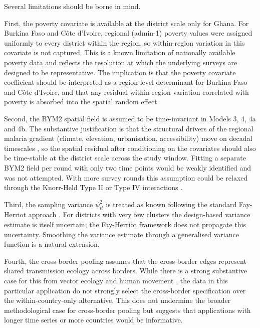 \documentclass{article}
\begin{document}
\label{sec:limitations}

Several limitations should be borne in mind.

First, the poverty covariate is available at the district scale only for
Ghana. For Burkina Faso and Côte d'Ivoire, regional (admin-1) poverty
values were assigned uniformly to every district within the region, so
within-region variation in this covariate is not captured. This is a
known limitation of nationally available poverty data and reflects the
resolution at which the underlying surveys are designed to be
representative. The implication is that the poverty covariate
coefficient should be interpreted as a region-level determinant for
Burkina Faso and Côte d'Ivoire, and that any residual within-region
variation correlated with poverty is absorbed into the spatial random
effect.

Second, the BYM2 spatial field is assumed to be time-invariant in Models
3, 4, 4a and 4b. The substantive justification is that the structural
drivers of the regional malaria gradient (climate, elevation,
urbanisation, accessibility) move on decadal timescales
\citep{bhatt2015, weiss2020}, so the spatial residual after conditioning
on the covariates should also be time-stable at the district scale
across the study window. Fitting a separate BYM2 field per round with
only two time points would be weakly identified and was not attempted.
With more survey rounds this assumption could be relaxed through the
Knorr-Held Type II or Type IV interactions
\citep{knorrheld2000, goicoa2018}.

Third, the sampling variance \(\psi_{it}^2\) is treated as known
following the standard Fay-Herriot approach \citep{you2002}. For
districts with very few clusters the design-based variance estimate is
itself uncertain; the Fay-Herriot framework does not propagate this
uncertainty. Smoothing the variance estimate through a generalised
variance function is a natural extension.

Fourth, the cross-border pooling assumes that the cross-border edges
represent shared transmission ecology across borders. While there is a
strong substantive case for this from vector ecology and human movement
\citep{bhatt2015, weiss2020, who2023}, the data in this particular
application do not strongly select the cross-border specification over
the within-country-only alternative. This does not undermine the broader
methodological case for cross-border pooling but suggests that
applications with longer time series or more countries would be
informative.
\end{document}
